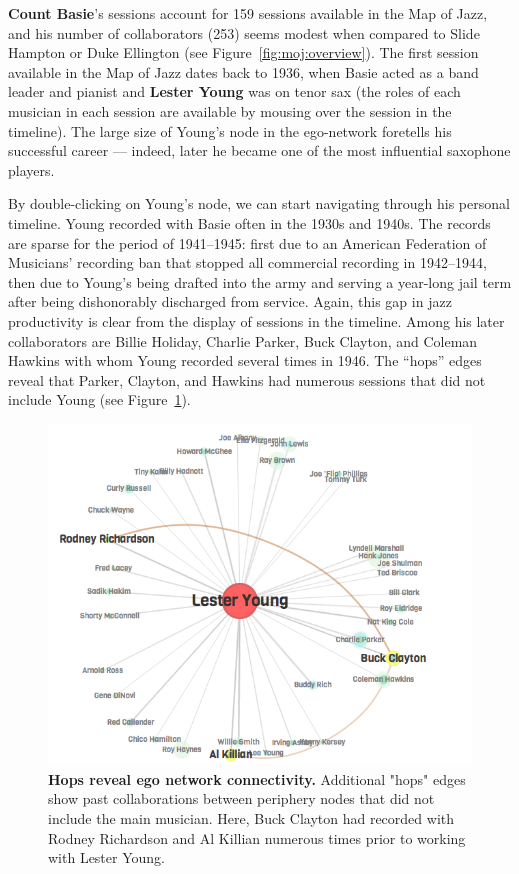 \documentclass[12pt]{cmuthesis}
\begin{document}
  \textbf{Count Basie}'s sessions account for 159 sessions available in the Map of Jazz, and his number of collaborators (253) seems modest when compared to Slide Hampton or Duke Ellington (see Figure~\ref{fig:moj:overview}). The first session available in the Map of Jazz dates back to 1936, when Basie acted as a band leader and pianist and \textbf{Lester Young} was on tenor sax (the roles of each musician in each session are available by mousing over the session in the timeline). The large size of Young's node in the ego-network foretells his successful career --- indeed, later he became one of the most influential saxophone players.

  By double-clicking on Young's node, we can start navigating through his personal timeline. Young recorded with Basie often in the 1930s and 1940s. The records are sparse for the period of 1941--1945: first due to an American Federation of Musicians' recording ban that stopped all commercial recording in 1942--1944, then due to Young's being drafted into the army and serving a year-long jail term after being dishonorably discharged from service. Again, this gap in jazz productivity is clear from the display of sessions in the timeline.  Among his later collaborators are Billie Holiday, Charlie Parker, Buck Clayton, and Coleman Hawkins with whom Young recorded several times in 1946. The ``hops'' edges reveal that Parker, Clayton, and Hawkins had numerous sessions that did not include Young (see Figure~\ref{fig:moj:young}).

  \begin{figure}[htb!]
    \centering
    \includegraphics[width=0.8\linewidth]{figures/lester-young}
    \caption{\textbf{Hops reveal ego network connectivity.} Additional "hops" edges show past collaborations between periphery nodes that did not include the main musician. Here, Buck Clayton had recorded with Rodney Richardson and Al Killian numerous times prior to working with Lester Young.}
    \label{fig:moj:young}
  \end{figure}
\end{document}
